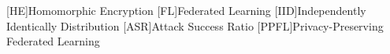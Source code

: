 \begin{acronym}
    [HE]{Homomorphic Encryption}
    [FL]{Federated Learning}
    [IID]{Independently Identically Distribution}
    [ASR]{Attack Success Ratio}
    [PPFL]{Privacy-Preserving Federated Learning}
\end{acronym}

